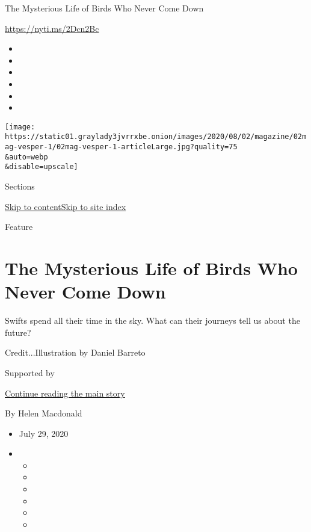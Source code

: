 The Mysterious Life of Birds Who Never Come Down

\url{https://nyti.ms/2Dcn2Bc}

\begin{itemize}
\item
\item
\item
\item
\item
\item
\end{itemize}

\texttt{[image: https://static01.graylady3jvrrxbe.onion/images/2020/08/02/magazine/02mag-vesper-1/02mag-vesper-1-articleLarge.jpg?quality=75\\\&auto=webp\\\&disable=upscale]}

Sections

\protect\hyperlink{site-content}{Skip to
content}\protect\hyperlink{site-index}{Skip to site index}

Feature

\hypertarget{the-mysterious-life-of-birds-who-never-come-down}{%
\section{The Mysterious Life of Birds Who Never Come
Down}\label{the-mysterious-life-of-birds-who-never-come-down}}

Swifts spend all their time in the sky. What can their journeys tell us
about the future?

Credit...Illustration by Daniel Barreto

Supported by

\protect\hyperlink{after-sponsor}{Continue reading the main story}

By Helen Macdonald

\begin{itemize}
\item
  July 29, 2020
\item
  \begin{itemize}
  \item
  \item
  \item
  \item
  \item
  \item
  \end{itemize}
\end{itemize}

